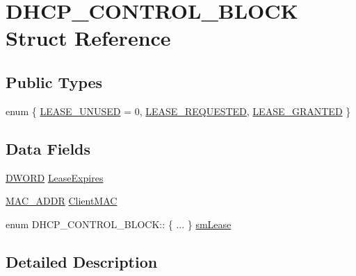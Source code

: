 \hypertarget{struct_d_h_c_p___c_o_n_t_r_o_l___b_l_o_c_k}{}\section{D\+H\+C\+P\+\_\+\+C\+O\+N\+T\+R\+O\+L\+\_\+\+B\+L\+O\+C\+K Struct Reference}
\label{struct_d_h_c_p___c_o_n_t_r_o_l___b_l_o_c_k}
\subsection*{Public Types}
\begin{DoxyCompactItemize}
\item 
enum \{ \hyperlink{struct_d_h_c_p___c_o_n_t_r_o_l___b_l_o_c_k_a99df18b74eba4f54aca738a63fbff170a22c59ee7098371ab2973eb3644493547}{L\+E\+A\+S\+E\+\_\+\+U\+N\+U\+S\+E\+D} = 0, 
\hyperlink{struct_d_h_c_p___c_o_n_t_r_o_l___b_l_o_c_k_a99df18b74eba4f54aca738a63fbff170a3e39b7b9932d7ae1d535a57f75fe4750}{L\+E\+A\+S\+E\+\_\+\+R\+E\+Q\+U\+E\+S\+T\+E\+D}, 
\hyperlink{struct_d_h_c_p___c_o_n_t_r_o_l___b_l_o_c_k_a99df18b74eba4f54aca738a63fbff170aedec7cf0dcb39a0de84521a5445a01d3}{L\+E\+A\+S\+E\+\_\+\+G\+R\+A\+N\+T\+E\+D}
 \}
\end{DoxyCompactItemize}
\subsection*{Data Fields}
\begin{DoxyCompactItemize}
\item 
\hyperlink{_generic_type_defs_8h_ad342ac907eb044443153a22f964bf0af}{D\+W\+O\+R\+D} \hyperlink{struct_d_h_c_p___c_o_n_t_r_o_l___b_l_o_c_k_ae659019685a42eb336844a7c70bfd6e5}{Lease\+Expires}
\item 
\hyperlink{_stack_tsk_8h_ad13a037a42c866ac11db19330b840589}{M\+A\+C\+\_\+\+A\+D\+D\+R} \hyperlink{struct_d_h_c_p___c_o_n_t_r_o_l___b_l_o_c_k_a1a848c890fc2e770e93568912cf5de1f}{Client\+M\+A\+C}
\item 
enum D\+H\+C\+P\+\_\+\+C\+O\+N\+T\+R\+O\+L\+\_\+\+B\+L\+O\+C\+K\+:: \{ ... \}  \hyperlink{struct_d_h_c_p___c_o_n_t_r_o_l___b_l_o_c_k_aab31659bde9e9e1a983743978966010d}{sm\+Lease}
\end{DoxyCompactItemize}


\subsection{Detailed Description}


